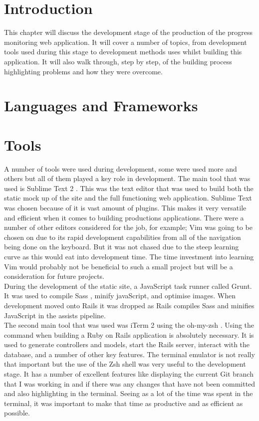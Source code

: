 \section{Introduction}
This chapter will discuss the development stage of the production of the progress monitoring web application. It will cover a number of topics, from development tools used during this stage to development methods uses whilst building this application. It will also walk through, step by step, of the building process highlighting problems and how they were overcome.\\

\section{Languages and Frameworks}


\section{Tools}
A number of tools were used during development, some were used more and others but all of them played a key role in development. The main tool that was used is Sublime Text 2 \citep{sublimetext:2011}. This was the text editor that was used to build both the static mock up of the site and the full functioning web application. Sublime Text was chosen because of it is vast amount of plugins. This makes it very versatile and efficient when it comes to building productions applications. There were a number of other editors considered for the job, for example; Vim \citep{vim:2013} was going to be chosen on due to its rapid development capabilities from all of the navigation being done on the keyboard. But it was not chased due to the steep learning curve as this would eat into development time. The time investment into learning Vim would probably not be beneficial to such a small project but will be a consideration for future projects.\\

During the development of the static site, a JavaScript task runner called Grunt. It was used to compile Sass \citep{sass:2006}, minify javaScript, and optimise images. When development moved onto Rails it was dropped as Rails compiles Sass and minifies JavaScript in the assists pipeline.\\

The second main tool that was used was iTerm 2 \citep{iterm:2011} using the oh-my-zsh \citep{zsh:2009}. Using the command when building a Ruby on Rails application is absolutely necessary. It is used to generate controllers and models, start the Rails server, interact with the database, and a number of other key features. The terminal emulator is not really that important but the use of the Zsh shell was very useful to the development stage. It has a number of excellent features like displaying the current Git \citep{git:2014} branch that I was working in and if there was any changes that have not been committed and also highlighting in the terminal. Seeing as a lot of the time was spent in the terminal, it was important to make that time as productive and as efficient as possible.\\

